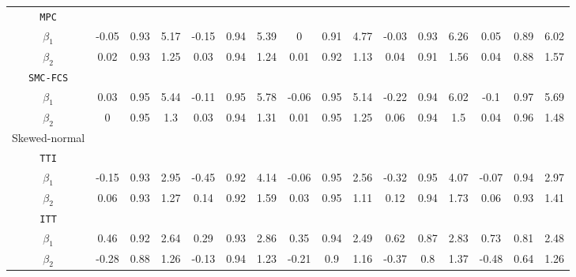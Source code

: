 \begin{table}[ht!]
{\begin{tabular}{c|ccc|ccc|ccc|ccc|ccc}
				\texttt{MPC}     &         &        &        &         &        &        &         &        &        &         &        &        &         &        &        \\
				$\beta_1$                         & -0.05   & 0.93  & 5.17  & -0.15   & 0.94  & 5.39  & 0   & 0.91  & 4.77  & -0.03   & 0.93  & 6.26  & 0.05   & 0.89  & 6.02  \\
				$\beta_2$                         & 0.02   & 0.93  & 1.25  & 0.03   & 0.94  & 1.24  & 0.01   & 0.92  & 1.13  & 0.04   & 0.91  & 1.56  & 0.04   & 0.88  & 1.57  \\
				\texttt{SMC-FCS} &         &        &        &         &        &        &         &        &        &         &        &        &         &        &        \\
				$\beta_1$                         & 0.03    & 0.95   & 5.44  & -0.11   & 0.95  & 5.78   & -0.06   & 0.95  & 5.14  & -0.22   & 0.94  & 6.02  & -0.1   & 0.97  & 5.69  \\
				$\beta_2$                         & 0   & 0.95  & 1.3  & 0.03   & 0.94  & 1.31  & 0.01   & 0.95  & 1.25  & 0.06    & 0.94  & 1.5  & 0.04   & 0.96  & 1.48  \\ \hline
				Skewed-normal                       &         &        &        &         &        &        &         &        &        &         &        &        &         &        &        \\
				\texttt{TTI}            &        &        &        &        &        &        &        &        &        &        &        &        &        &        &        \\
				$\beta_1$      & -0.15  & 0.93  & 2.95  & -0.45  & 0.92  & 4.14  & -0.06  & 0.95   & 2.56  & -0.32  & 0.95  & 4.07  & -0.07  & 0.94  & 2.97  \\
				$\beta_2$      & 0.06  & 0.93  & 1.27  & 0.14  & 0.92  & 1.59  & 0.03  & 0.95  & 1.11  & 0.12  & 0.94  & 1.73  & 0.06  & 0.93  & 1.41  \\
				\texttt{ITT}            &        &        &        &        &        &        &        &        &        &        &        &        &        &        &        \\
				$\beta_1$      & 0.46  & 0.92  & 2.64  & 0.29  & 0.93  & 2.86  & 0.35  & 0.94   & 2.49  & 0.62  & 0.87  & 2.83  & 0.73  & 0.81  & 2.48  \\
				$\beta_2$      & -0.28  & 0.88  & 1.26  & -0.13  & 0.94  & 1.23  & -0.21  & 0.9  & 1.16  & -0.37  & 0.8  & 1.37  & -0.48  & 0.64  & 1.26  \\

\end{tabular}}
\end{table}
